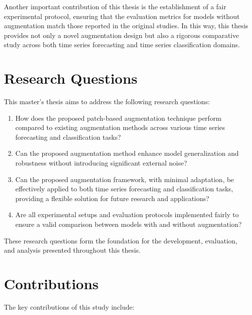 Another important contribution of this thesis is the establishment of a fair experimental protocol, ensuring that the evaluation metrics for models without augmentation match those reported in the original studies. In this way, this thesis provides not only a novel augmentation design but also a rigorous comparative study across both time series forecasting and time series classification domains.


\section{Research Questions}

This master's thesis aims to address the following research questions:

\begin{enumerate}
    \item  How does the proposed patch-based augmentation technique perform compared to existing augmentation methods across various time series forecasting and classification tasks?
    \item  Can the proposed augmentation method enhance model generalization and robustness without introducing significant external noise?
    \item  Can the proposed augmentation framework, with minimal adaptation, be effectively applied to both time series forecasting and classification tasks, providing a flexible solution for future research and applications?
    \item  Are all experimental setups and evaluation protocols implemented fairly to ensure a valid comparison between models with and without augmentation?
\end{enumerate}

These research questions form the foundation for the development, evaluation, and analysis presented throughout this thesis.


\section{Contributions}

The key contributions of this study include:

